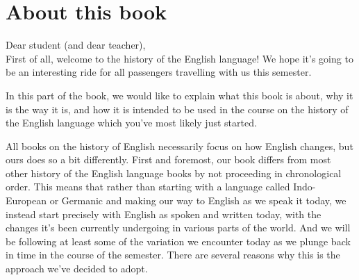 \chapter{About this book}

Dear student (and dear teacher),\smallskip\\

First of all, welcome to the history of the English language! We hope it's going to be an interesting ride for all passengers travelling with us this semester.

In this part of the book, we would like to explain what this book is about, why it is the way it is, and how it is intended to be used in the course on the history of the English language which you've most likely just started.

All books on the history of English necessarily focus on how English changes, but ours does so a bit differently. First and foremost, our book differs from most other history of the English language books by not proceeding in chronological order. This means that rather than starting with a language called Indo-European or Germanic and making our way to English as we speak it today, we instead start precisely with English as spoken and written today, with the changes it's been currently undergoing in various parts of the world. And we will be following at least some of the variation we encounter today as we plunge back in time in the course of the semester. There are several reasons why this is the approach we've decided to adopt.

